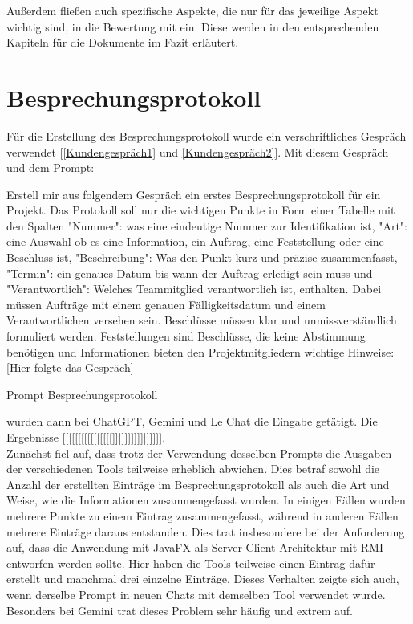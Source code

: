 Außerdem fließen auch spezifische Aspekte, die nur für das jeweilige Aspekt wichtig sind, in die Bewertung mit ein. 
Diese werden in den entsprechenden Kapiteln für die Dokumente im Fazit erläutert.


\section{Besprechungsprotokoll}  \label{CompBesprechungsprotokoll}

Für die Erstellung des Besprechungsprotokoll wurde ein verschriftliches Gespräch verwendet [\autoref{Kundengespräch1} 
und \autoref{Kundengespräch2}]. Mit diesem Gespräch und dem Prompt:
    
\begin{prompt}[H]
    \begin{tcolorbox}[colback=gray!20, colframe=gray!20, boxrule=0pt, sharp corners] 
        Erstell mir aus folgendem Gespräch ein erstes Besprechungsprotokoll für ein Projekt. Das Protokoll soll nur 
        die wichtigen Punkte in Form einer Tabelle mit den Spalten "Nummer": was eine eindeutige Nummer zur 
        Identifikation ist, "Art": eine Auswahl ob es eine Information, ein Auftrag, eine Feststellung oder eine 
        Beschluss ist, "Beschreibung": Was den Punkt kurz und präzise zusammenfasst, "Termin": ein genaues Datum bis 
        wann der Auftrag erledigt sein muss und "Verantwortlich": Welches Teammitglied verantwortlich ist, enthalten. 
        Dabei müssen Aufträge mit einem genauen Fälligkeitsdatum und einem Verantwortlichen versehen sein. Beschlüsse 
        müssen klar und unmissverständlich formuliert werden. Feststellungen sind Beschlüsse, die keine Abstimmung 
        benötigen und Informationen bieten den Projektmitgliedern wichtige Hinweise: 
        [Hier folgte das Gespräch]
        \vfill
    \end{tcolorbox}
    \caption{Prompt Besprechungsprotokoll}
    \label{Prompt Besprechungsprotokoll}
\end{prompt}

wurden dann bei ChatGPT, Gemini und Le Chat die Eingabe getätigt. Die Ergebnisse [[[[[[[[[[[[[[[[]]]]]]]]]]]]]]]].\\

Zunächst fiel auf, dass trotz der Verwendung desselben Prompts die Ausgaben der verschiedenen Tools teilweise erheblich abwichen. 
Dies betraf sowohl die Anzahl der erstellten Einträge im Besprechungsprotokoll als auch die Art und Weise, wie die Informationen 
zusammengefasst wurden. In einigen Fällen wurden mehrere Punkte zu einem Eintrag zusammengefasst, während in anderen Fällen mehrere 
Einträge daraus entstanden. Dies trat insbesondere bei der Anforderung auf, dass die Anwendung mit JavaFX als Server-Client-Architektur 
mit RMI entworfen werden sollte. Hier haben die Tools teilweise einen Eintrag dafür erstellt und manchmal drei einzelne Einträge. 
Dieses Verhalten zeigte sich auch, wenn derselbe Prompt in neuen Chats mit demselben Tool verwendet wurde. Besonders bei Gemini trat 
dieses Problem sehr häufig und extrem auf.\\

